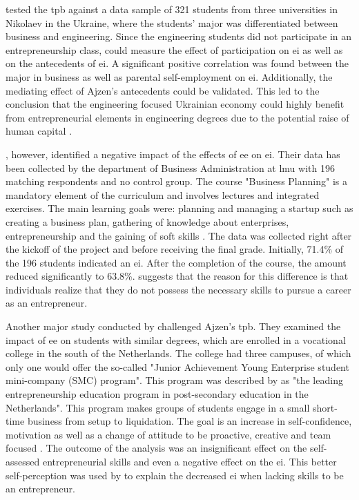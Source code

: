 \citet{solesvik2013entrepreneurial} tested the \ac{tpb} against a data sample of 321 students from three universities in Nikolaev in the Ukraine, where the students' major was differentiated between business and engineering. Since the engineering students did not participate in an entrepreneurship class, \citet{solesvik2013entrepreneurial} could measure the effect of participation on \ac{ei} as well as on the antecedents of \ac{ei}. A significant positive correlation was found between the major in business as well as parental self-employment on \ac{ei}. Additionally, the mediating effect of Ajzen's antecedents could be validated. This led to the conclusion that the engineering focused Ukrainian economy could highly benefit from entrepreneurial elements in engineering degrees due to the potential raise of human capital \citep{solesvik2013entrepreneurial}.

\citet{von2010effects}, however, identified a negative impact of the effects of \ac{ee} on \ac{ei}. Their data has been collected by the department of Business Administration at \ac{lmu} with 196 matching respondents and no control group. The course "Business Planning" is a mandatory element of the curriculum and involves lectures and integrated exercises. The main learning goals were: planning and managing a startup such as creating a business plan, gathering of knowledge about enterprises, entrepreneurship and the gaining of soft skills \citep{von2010effects}. The data was collected right after the kickoff of the project and before receiving the final grade. Initially, 71.4\% of the 196 students indicated an \ac{ei}. After the completion of the course, the amount reduced significantly to 63.8\%. \citet{von2010effects} suggests that the reason for this difference is that individuals realize that they do not possess the necessary skills to pursue a career as an entrepreneur.

Another major study conducted by \citet{oosterbeek2010impact} challenged Ajzen's \ac{tpb}. They examined the impact of \ac{ee} on students with similar degrees, which are enrolled in a vocational college in the south of the Netherlands. The  college had three campuses, of which only one would offer the so-called "Junior Achievement Young Enterprise student mini-company (SMC) program". This program was described by \citet[p. 444]{oosterbeek2010impact} as "the leading entrepreneurship education program in post-secondary education in the Netherlands". This program makes groups of students engage in a small short-time business from setup to liquidation. The goal is an increase in self-confidence, motivation as well as a change of attitude to be proactive, creative and team focused \citep{oosterbeek2010impact}. The outcome of the analysis was an insignificant effect on the self-assessed entrepreneurial skills and even a negative effect on the \ac{ei}. This better self-perception was used by \citet{oosterbeek2010impact} to explain the decreased \ac{ei} when lacking skills to be an entrepreneur.

